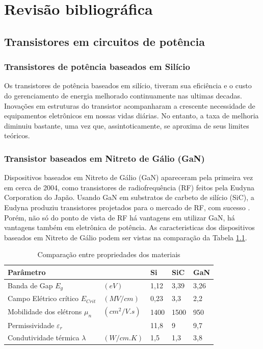 \chapter{Revisão bibliográfica}
\label{chapterRevisao}
\section{Transistores em circuitos de potência}
\label{sectionCap2transistores}
\subsection{Transistores de potência baseados em Silício}
Os transistores de potência baseados em silício, tiveram sua eficiência e o custo do gerenciamento de energia melhorado continuamente nas ultimas decadas. Inovações em estruturas do transistor acompanharam a crescente necessidade de equipamentos eletrônicos em nossas vidas diárias. No entanto, a taxa de melhoria diminuiu bastante, uma vez que, assintoticamente, se aproxima de seus limites teóricos. \cite{lidow_rooij_strydom_reusch_glaser_2020}

\subsection{Transistor baseados em Nitreto de Gálio (GaN)}
Dispositivos baseados em Nitreto de Gálio (GaN) apareceram pela primeira vez em cerca de 2004, como transistores de radiofrequência (RF) feitos pela Eudyna Corporation do Japão. Usando GaN em substratos de carbeto de silício (SiC), a Eudyna produziu transistores projetados para o mercado de RF, com sucesso \cite{Alex}. Porém, não só do ponto de vista de RF há vantagens em utilizar GaN, há vantagens também em eletrônica de potência. As caracteristicas dos dispositivos baseados em Nitreto de Gálio podem ser vistas na comparação da Tabela \ref{t_materiais}.

\begin{table}[!htb]
\centering
\caption{Comparação entre propriedades dos materiais \cite{lidow_rooij_strydom_reusch_glaser_2020}}
\begin{tabular}{lllll}
\hline
Parâmetro           &                & Si    & SiC   & GaN \\ \hline
Banda de Gap $E_g$& $(eV)$             & 1,12  & 3,39  & 3,26\\
Campo Elétrico crítico $E_{Crit}$ &$(MV/cm)$   & 0,23  & 3,3   & 2,2\\
Mobilidade dos elétrons $\mu_n$ &$(cm^2/V.s)$& 1400  & 1500  & 950\\
Permissividade $\varepsilon_r$ &     & 11,8  & 9     & 9,7\\
Condutividade térmica $\lambda$& $(W/cm.K)$     & 1,5   & 1,3   & 3,8\\ \hline
\end{tabular}
\label{t_materiais}
\end{table}

